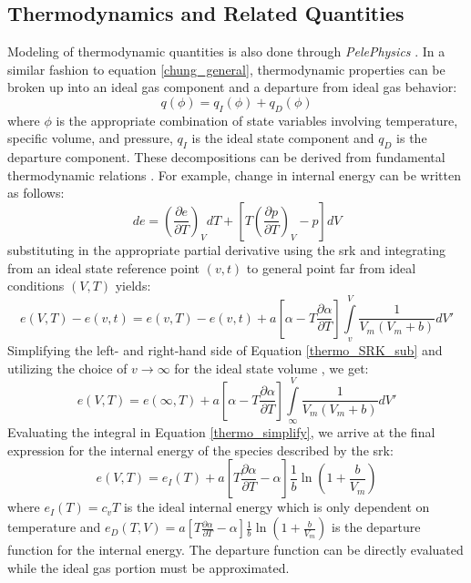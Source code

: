 \subsection{Thermodynamics and Related Quantities}
Modeling of thermodynamic quantities is also done through \textit{PelePhysics} \cite{}. In a similar fashion to equation \ref{chung_general}, thermodynamic properties can be broken up into an ideal gas component and a departure from ideal gas behavior:
\begin{equation} \label{thermo_general}
q(\phi) = q_{I}(\phi) + q_{D}(\phi)
\end{equation}
where $\phi$ is the appropriate combination of state variables involving temperature, specific volume, and pressure, $q_{I}$ is the ideal state component and $q_{D}$ is the departure component. These decompositions can be derived from fundamental thermodynamic relations \cite{}. For example, change in internal energy can be written as follows:
\begin{equation} \label{thermo_example}
de = \left( \dfrac{\partial e}{\partial T} \right)_{V} dT + \left[ T \left( \dfrac{\partial p}{\partial T} \right)_{V} - p  \right] dV
\end{equation}
substituting in the appropriate partial derivative using the \gls{srk} and integrating from an ideal state reference point $(v,t)$ to general point far from ideal conditions $(V,T)$ yields:
\begin{equation}  \label{thermo_SRK_sub}
e(V,T) - e(v,t) =  e(v,T) - e(v,t) + a \left[ \alpha - T \dfrac{\partial \alpha}{\partial T} \right] \int\limits_{v}^{V} \dfrac{1}{V_m(V_m + b)}dV'
\end{equation}
Simplifying the left- and right-hand side of Equation \ref{thermo_SRK_sub} and utilizing the choice of $v \to \infty$ for the ideal state volume \cite{}, we get:
\begin{equation} \label{thermo_simplify}
e(V,T) =  e(\infty,T) + a \left[ \alpha - T \dfrac{\partial \alpha}{\partial T} \right] \int\limits_{\infty}^{V} \dfrac{1}{V_m(V_m + b)}dV'
\end{equation}
Evaluating the integral in Equation \ref{thermo_simplify}, we arrive at the final expression for the internal energy of the species described by the \gls{srk}: 
\begin{equation} \label{thermo_final}
e(V,T) =  e_I(T) + a \left[ T \dfrac{\partial \alpha}{\partial T} - \alpha \right] \dfrac{1}{b}\ln\left( 1 + \dfrac{b}{V_m} \right)
\end{equation}
where $e_I(T)=c_vT$ is the ideal internal energy which is only dependent on temperature and $e_D(T,V) = a \left[ T \tfrac{\partial \alpha}{\partial T} - \alpha \right] \tfrac{1}{b}\ln\left( 1 + \tfrac{b}{V_m} \right)$ is the departure function for the internal energy. The departure function can be directly evaluated while the ideal gas portion must be approximated. 

